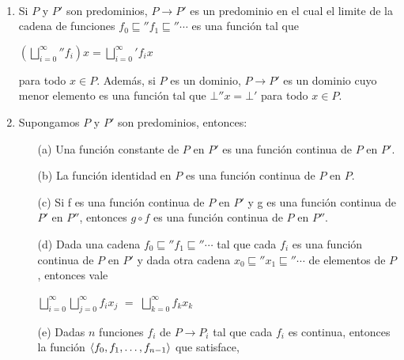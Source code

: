 \begin{proposition}\

\begin{enumerate}

\item Si $P$ y $P'$ son predominios, $P \rightarrow P'$ es un predominio en
el cual el limite de la cadena de funciones $f_0 \sqsubseteq'' f_1 \sqsubseteq'' \cdots$ 
es una funci\'on tal que 

\begin{center}
$({\bigsqcup\limits^{\infty}_{i=0}}'' f_{i})x = {\bigsqcup\limits^{\infty}_{i=0}}' f_{i} x$
\end{center}

para todo $x \in P$. Adem\'as, si $P$ es un dominio, $P \rightarrow P'$ es un dominio
cuyo menor elemento es una funci\'on tal que $\bot'' x = \bot'$ para todo $x \in P$.

\item Supongamos $P$ y $P'$ son predominios, entonces:

\begin{enumerate}
\item[(a)] Una funci\'on constante de $P$ en $P'$ es una funci\'on continua de $P$ en $P'$.\\

\item[(b)] La funci\'on identidad en $P$ es una funci\'on continua de $P$ en $P$.\\

\item[(c)] Si f es una funci\'on continua de $P$ en $P'$ y g es una funci\'on
continua de $P'$ en $P''$, entonces $g \circ f$ es una funci\'on continua de $P$ en $P''$.\\

\item[(d)] Dada una cadena $f_0 \sqsubseteq'' f_1 \sqsubseteq'' \cdots$ tal que cada $f_i$ es una
funci\'on continua de $P$ en $P'$ y dada otra cadena $x_0 \sqsubseteq'' x_1 \sqsubseteq'' \cdots$ de
elementos de $P$, entonces vale

\begin{center}
${\bigsqcup\limits^{\infty}_{i=0}}{\bigsqcup\limits^{\infty}_{j=0}}f_i x_j$ $=$
${\bigsqcup\limits^{\infty}_{k=0}}f_k x_k$
\end{center}

\item[(e)] Dadas $n$ funciones $f_i$ de $P \rightarrow P_i$ tal que cada $f_i$ es continua, entonces
la funci\'on $\langle f_0,f_1,\ldots,f_{n-1} \rangle$ que satisface,


\end{enumerate}
\end{enumerate}
\end{proposition}
